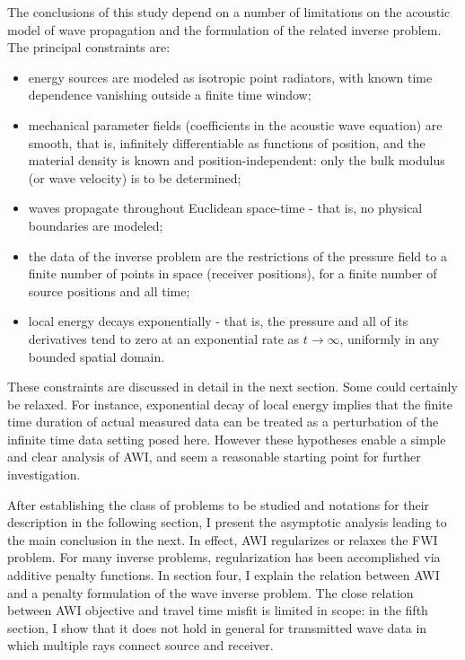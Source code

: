 The conclusions of this study depend on a number of limitations on the
acoustic model of wave propagation and the formulation of the related
inverse problem. The principal constraints are:
\begin{itemize}
  \item energy sources are modeled as isotropic point radiators, with
    known time dependence vanishing outside a finite time window;
  \item mechanical parameter fields (coefficients in the acoustic wave
    equation) are smooth, that is, infinitely differentiable as
    functions of position, and the material density is known and
    position-independent: only the bulk modulus (or wave velocity) is
    to be determined;
  \item waves propagate throughout Euclidean space-time - that is, no
    physical boundaries are modeled;
  \item the data of the inverse problem are the restrictions of the
    pressure field to a finite number of points in space (receiver
    positions), for a finite number of source positions and all time;
  \item local energy decays exponentially - that is, the pressure and
    all of its derivatives tend to zero at an exponential rate as $t
    \rightarrow \infty$,
    uniformly in any bounded spatial domain.
  \end{itemize}
  These constraints are discussed in detail in the next section. Some
  could certainly be relaxed. For instance, exponential decay of local
  energy implies that the finite time duration of actual measured data
  can be treated as a perturbation of the infinite time data setting
  posed here. However these hypotheses enable a simple and clear
  analysis of AWI, and seem a reasonable starting point for further
  investigation.
  
After establishing the class of problems to be studied and notations
for their description in the following section, I present the
asymptotic analysis leading to the main conclusion in the next. In
effect, AWI regularizes or relaxes the FWI problem. For many inverse
problems, regularization has been accomplished via additive penalty
functions. In section four, I explain the relation between AWI and a
penalty formulation of the wave inverse problem. The
close relation between AWI objective and travel time misfit is limited
in scope: in the fifth section, I show that it does not hold in
general for transmitted wave data in which multiple rays connect
source and receiver. 


